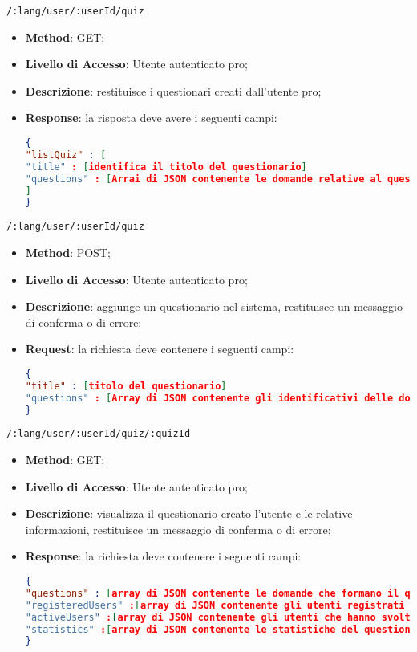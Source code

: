 \item \texttt{/:lang/user/:userId/quiz}
	\begin{itemize}
		\item \textbf{Method}: GET;
		\item \textbf{Livello di Accesso}: Utente autenticato pro;
		\item \textbf{Descrizione}: restituisce i questionari creati dall'utente pro;
		\item \textbf{Response}: la risposta deve avere i seguenti campi:
\begin{lstlisting}[language=json,firstnumber=1]
{
"listQuiz" : [ 
"title" : [identifica il titolo del questionario]
"questions" : [Arrai di JSON contenente le domande relative al questionario]
]
}
\end{lstlisting}
	\end{itemize}	
	
	
	\item \texttt{/:lang/user/:userId/quiz}
		\begin{itemize}
			\item \textbf{Method}: POST;
			\item \textbf{Livello di Accesso}: Utente autenticato pro;
			\item \textbf{Descrizione}: aggiunge un questionario nel sistema, restituisce un messaggio di conferma o di errore;
			\item \textbf{Request}: la richiesta deve contenere i seguenti campi:
\begin{lstlisting}[language=json,firstnumber=1]
{
"title" : [titolo del questionario]
"questions" : [Array di JSON contenente gli identificativi delle domande che compongono il questionario]
}
\end{lstlisting}
		\end{itemize}
		
	\item \texttt{/:lang/user/:userId/quiz/:quizId}
	\begin{itemize}
		\item \textbf{Method}: GET;
		\item \textbf{Livello di Accesso}: Utente autenticato pro;
		\item \textbf{Descrizione}: visualizza il questionario creato l'utente e le relative informazioni, restituisce un messaggio di conferma o di errore;
		\item \textbf{Response}: la richiesta deve contenere i seguenti campi:
\begin{lstlisting}[language=json,firstnumber=1]
{
"questions" : [array di JSON contenente le domande che formano il questionario]
"registeredUsers" :[array di JSON contenente gli utenti registrati al questionario]
"activeUsers" :[array di JSON contenente gli utenti che hanno svolto il questionario]
"statistics" :[array di JSON contenente le statistiche del questionario]
}
\end{lstlisting}
	\end{itemize}		
		
